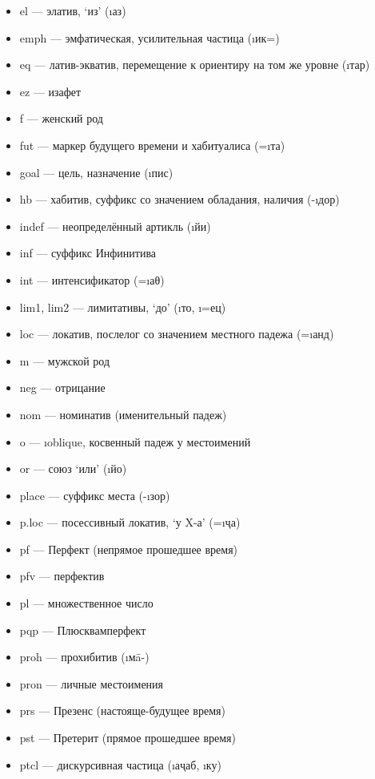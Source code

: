{\begin{itemize}
  \item {\sc el} — элатив, ‘из’ (\i{аз})
  \item {\sc emph} — эмфатическая, усилительная частица (\i{ик}=)
  \item {\sc eq} — латив-экватив, перемещение к ориентиру на том же уровне (\i{тар})
  \item {\sc ez} — изафет
  \item {\sc f} — женский род
  \item {\sc fut} — маркер будущего времени и хабитуалиса (=\i{та})
  \item {\sc goal} — цель, назначение (\i{пис})
  \item {\sc hb} — хабитив, суффикс со значением обладания, наличия (-\i{дор})
  \item {\sc indef} — неопределённый артикль (\i{йи})
  \item {\sc inf} — суффикс Инфинитива
  \item {\sc int} — интенсификатор (=\i{аθ})
  \item {\sc lim1}, {\sc lim2} — лимитативы, ‘до’ (\i{то}, \i{=ец})
  \item {\sc loc} — локатив, послелог со значением местного падежа (=\i{анд})
  \item {\sc m} — мужской род
  \item {\sc neg} — отрицание
  \item {\sc nom} — номинатив (именительный падеж)
  \item {\sc o} — \i{oblique}, косвенный падеж у местоимений
  \item {\sc or} — союз ‘или’ (\i{йо})
  \item {\sc place} — суффикс места (-\i{зор})
  \item {\sc p.loc} — посессивный локатив, ‘у X-а’ (=\i{ҷа})
  \item {\sc pf} — Перфект (непрямое прошедшее время)
  \item {\sc pfv} — перфектив
  \item {\sc pl} — множественное число
  \item {\sc pqp} — Плюсквамперфект
  \item {\sc proh} — прохибитив (\i{мā}-)
  \item {\sc pron} — личные местоимения
  \item {\sc prs} — Презенс (настояще-будущее время)
  \item {\sc pst} — Претерит (прямое прошедшее время)
  \item {\sc ptcl} — дискурсивная частица (\i{аҷаб}, \i{ку})

\end{itemize}}
